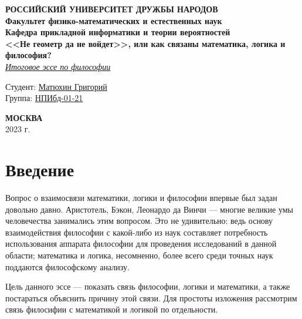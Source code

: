\documentclass[a4page]{article}
\begin{document}
\begin{titlepage}
	\begin{center}
		\hfill \break
		\textbf{
			\large{РОССИЙСКИЙ УНИВЕРСИТЕТ ДРУЖБЫ НАРОДОВ}\\
			\normalsize{Факультет физико-математических и естественных наук}\\
			\normalsize{Кафедра прикладной информатики и теории вероятностей}\\
		}
		\vspace*{\fill}
		\Large{\textbf{<<Не геометр да не войдет>>, или как связаны математика, логика и философия?}}
		\\
		\underline{\textit{\normalsize{Итоговое эссе по философии}}}
		\vspace*{\fill}

	\end{center}

	\begin{flushright}
		Студент: \underline{Матюхин Григорий}\\ \vspace{0.5cm}
		Группа: \underline{НПИбд-01-21}
	\end{flushright}

	\begin{center} \textbf{МОСКВА} \\ 2023 г. \end{center}
	\thispagestyle{empty}

\end{titlepage}

\newpage

\tableofcontents

\newpage

\section{Введение}
Вопрос о взаимосвязи математики, логики и философии впервые был задан довольно давно.
Аристотель, Бэкон, Леонардо да Винчи --- многие великие умы человечества занимались этим вопросом.
Это не удивительно: ведь основу взаимодействия философии с какой-либо из наук
составляет потребность использования аппарата философии для проведения исследований в данной области;
математика и логика, несомненно, более всего среди точных наук поддаются философскому анализу.

Цель данного эссе --- показать связь философии, логики и математики,
а также постараться объяснить причину этой связи.
Для простоты изложения рассмотрим связь филосифии с математикой и логикой по отдельности.
\end{document}
